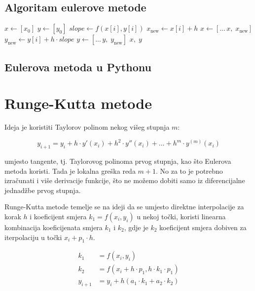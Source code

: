 \begin{multicols}{2}
\subsection{Algoritam eulerove metode}

\begin{algorithmic}
        \State $x \gets [x_0]$
        \State $y \gets [y_0]$
        \For{$i \in [0, n\rangle$}
            \State $slope \gets f(x[i], y[i])$
            \State $x_{\text{new}} \gets x[i] + h$
            \State $x \gets [...\,x,\;x_{\text{new}}]$
            \State $y_{\text{new}} \gets y[i] + h \cdot slope$
            \State $y \gets [...\,y,\;y_{\text{new}}]$
        \EndFor
        \State \Return $x,\;y$
    \EndFunction
\end{algorithmic}

\columnbreak

\subsection{Eulerova metoda u Pythonu}


\end{multicols}

\section{Runge-Kutta metode}

Ideja je koristiti Taylorov polinom nekog višeg stupnja $m$:

$$
y_{i+1} = y_i + h\cdot y'(x_i) + h^2 \cdot y''(x_i) + \dots + h^m \cdot y^{(m)}(x_i)
$$

umjesto tangente, tj. Taylorovog polinoma prvog stupnja, kao što Eulerova metoda
koristi. Tada je lokalna greška reda $m + 1$. No za to je potrebno izračunati i
više derivacije funkcije, što ne možemo dobiti samo iz diferencijalne jednadžbe
prvog stupnja.

Runge-Kutta metode temelje se na ideji da se umjesto direktne interpolacije za
korak $h$ i koeficijent smjera $k_1 = f(x_i,y_i)$ u nekoj točki, koristi
linearna kombinacija koeficijenata smjera $k_1$ i $k_2$, gdje je $k_2$
koeficijent smjera dobiven za iterpolaciju u točki $x_i + p_1\cdot h$.

\begin{align*}
    k_1 &= f(x_i,y_i)\\
    k_2 &= f(x_i + h \cdot p_1,h\cdot k_1\cdot p_1)\\
    y_{i+1} &= y_i + h (a_1\cdot k_1 + a_2 \cdot k_2)
\end{align*}

